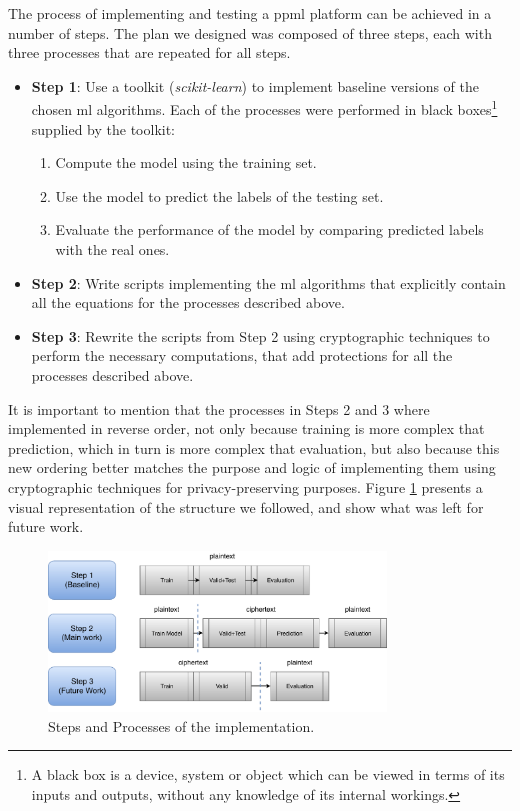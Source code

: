 The process of implementing and testing a \ac{ppml} platform can be achieved in a number of steps. The plan we designed was composed of three steps, each with three processes that are repeated for all steps.

\begin{itemize}

	\item \textbf{Step 1}: Use a toolkit (\textit{scikit-learn}) to implement baseline versions of the chosen \ac{ml} algorithms. Each of the processes were performed in black boxes\footnote{A black box is a device, system or object which can be viewed in terms of its inputs and outputs, without any knowledge of its internal workings.} supplied by the toolkit:
	\begin{enumerate}
		\item Compute the model using the training set.
		\item Use the model to predict the labels of the testing set.
		\item Evaluate the performance of the model by comparing predicted labels with the real ones.
	\end{enumerate}
	\item \textbf{Step 2}: Write scripts implementing the \ac{ml} algorithms that explicitly contain all the equations for the processes described above.
	\item \textbf{Step 3}: Rewrite the scripts from Step 2 using cryptographic techniques to perform the necessary computations, that add protections for all the processes described above.
\end{itemize}

It is important to mention that the processes in Steps 2 and 3 where implemented in reverse order, not only because training is more complex that prediction, which in turn is more complex that evaluation, but also because this new ordering better matches the purpose and logic of implementing them using cryptographic techniques for privacy-preserving purposes. Figure \ref{fig:steps} presents a visual representation of the structure we followed, and show what was left for future work.

\begin{figure}[ht]
    \centering
    \includegraphics[width=0.80\textwidth]{images/ImplementationSteps.pdf}
    \caption{Steps and Processes of the implementation.}
    \label{fig:steps}
 \end{figure}


